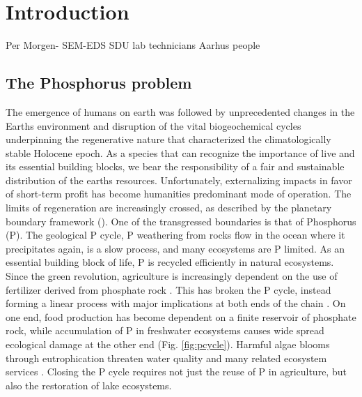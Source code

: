 \documentclass[12pt,twoside]{book}
\begin{document}
\chapter{Introduction}\label{Intro}

Per Morgen- SEM-EDS
SDU lab technicians
Aarhus people

\section{The Phosphorus problem}\label{the-phosphorus-problem}

The emergence of humans on earth was followed by unprecedented changes in the Earths environment and disruption of the vital biogeochemical cycles underpinning the regenerative nature that characterized the climatologically stable Holocene epoch. As a species that can recognize the importance of live and its essential building blocks, we bear the responsibility of a fair and sustainable distribution of the earths resources. Unfortunately, externalizing impacts in favor of short-term profit has become humanities predominant mode of operation. The limits of regeneration are increasingly crossed, as described by the planetary boundary framework (\citep{Richardson2023}). One of the transgressed boundaries is that of Phosphorus (P). The geological P cycle, P weathering from rocks flow in the ocean where it precipitates again, is a slow process, and many ecosystems are P limited. As an essential building block of life, P is recycled efficiently in natural ecosystems. Since the green revolution, agriculture is increasingly dependent on the use of fertilizer derived from phosphate rock \citep{Ashley2011}. This has broken the P cycle, instead forming a linear process with major implications at both ends of the chain \citep{Cordell2010}. On one end, food production has become dependent on a finite reservoir of phosphate rock, while accumulation of P in freshwater ecosystems causes wide spread ecological damage at the other end (Fig. \ref{fig:pcycle}). Harmful algae blooms through eutrophication threaten water quality and many related ecosystem services \citep{Ansari2014}. Closing the P cycle requires not just the reuse of P in agriculture, but also the restoration of lake ecosystems.
\end{document}
